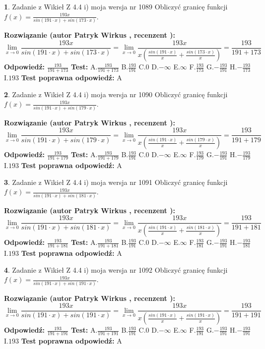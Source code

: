 \documentclass[12pt, a4paper]{article}
\theoremstyle{definition} %
\newtheorem{zad}{}
\newcommand{\zadStart}[1]{\begin{zad}#1\newline}
\newcommand{\zadStop}{\end{zad}}
\newcommand{\rozwStart}[2]{\noindent \textbf{Rozwiązanie (autor #1 , recenzent #2): }\newline}
\newcommand{\rozwStop}{\newline}
\newcommand{\odpStart}{\noindent \textbf{Odpowiedź:}\newline}
\newcommand{\odpStop}{\newline}
\newcommand{\testStart}{\noindent \textbf{Test:}\newline}
\newcommand{\testStop}{\newline}
\newcommand{\kluczStart}{\noindent \textbf{Test poprawna odpowiedź:}\newline}
\newcommand{\kluczStop}{\newline}
\begin{document}
\zadStart{Zadanie z Wikieł Z 4.4 i) moja wersja nr 1089}
Obliczyć granicę funkcji $f(x)=\frac{193x}{sin(191\cdot x) +sin(173\cdot x)}$.
\zadStop
\rozwStart{Patryk Wirkus}{}
$$\lim\limits_{x\to 0}\frac{193x}{sin(191\cdot x) +sin(173\cdot x)}=\lim\limits_{x\to 0}\frac{193x}{x(\frac{sin(191\cdot x)}{x}+\frac{sin(173\cdot x)}{x})}=\frac{193}{191+173}$$
\rozwStop
\odpStart
$\frac{193}{191+173}$
\odpStop
\testStart
A.$\frac{193}{191+173}$
B.$\frac{193}{191}$
C.$0$
D.$-\infty$
E.$\infty$
F.$\frac{193}{173}$
G.$-\frac{193}{191}$
H.$-\frac{193}{173}$
I.$193$
\testStop
\kluczStart
A
\kluczStop



\zadStart{Zadanie z Wikieł Z 4.4 i) moja wersja nr 1090}
Obliczyć granicę funkcji $f(x)=\frac{193x}{sin(191\cdot x) +sin(179\cdot x)}$.
\zadStop
\rozwStart{Patryk Wirkus}{}
$$\lim\limits_{x\to 0}\frac{193x}{sin(191\cdot x) +sin(179\cdot x)}=\lim\limits_{x\to 0}\frac{193x}{x(\frac{sin(191\cdot x)}{x}+\frac{sin(179\cdot x)}{x})}=\frac{193}{191+179}$$
\rozwStop
\odpStart
$\frac{193}{191+179}$
\odpStop
\testStart
A.$\frac{193}{191+179}$
B.$\frac{193}{191}$
C.$0$
D.$-\infty$
E.$\infty$
F.$\frac{193}{179}$
G.$-\frac{193}{191}$
H.$-\frac{193}{179}$
I.$193$
\testStop
\kluczStart
A
\kluczStop



\zadStart{Zadanie z Wikieł Z 4.4 i) moja wersja nr 1091}
Obliczyć granicę funkcji $f(x)=\frac{193x}{sin(191\cdot x) +sin(181\cdot x)}$.
\zadStop
\rozwStart{Patryk Wirkus}{}
$$\lim\limits_{x\to 0}\frac{193x}{sin(191\cdot x) +sin(181\cdot x)}=\lim\limits_{x\to 0}\frac{193x}{x(\frac{sin(191\cdot x)}{x}+\frac{sin(181\cdot x)}{x})}=\frac{193}{191+181}$$
\rozwStop
\odpStart
$\frac{193}{191+181}$
\odpStop
\testStart
A.$\frac{193}{191+181}$
B.$\frac{193}{191}$
C.$0$
D.$-\infty$
E.$\infty$
F.$\frac{193}{181}$
G.$-\frac{193}{191}$
H.$-\frac{193}{181}$
I.$193$
\testStop
\kluczStart
A
\kluczStop



\zadStart{Zadanie z Wikieł Z 4.4 i) moja wersja nr 1092}
Obliczyć granicę funkcji $f(x)=\frac{193x}{sin(191\cdot x) +sin(191\cdot x)}$.
\zadStop
\rozwStart{Patryk Wirkus}{}
$$\lim\limits_{x\to 0}\frac{193x}{sin(191\cdot x) +sin(191\cdot x)}=\lim\limits_{x\to 0}\frac{193x}{x(\frac{sin(191\cdot x)}{x}+\frac{sin(191\cdot x)}{x})}=\frac{193}{191+191}$$
\rozwStop
\odpStart
$\frac{193}{191+191}$
\odpStop
\testStart
A.$\frac{193}{191+191}$
B.$\frac{193}{191}$
C.$0$
D.$-\infty$
E.$\infty$
F.$\frac{193}{191}$
G.$-\frac{193}{191}$
H.$-\frac{193}{191}$
I.$193$
\testStop
\kluczStart
A
\kluczStop
\end{document}
